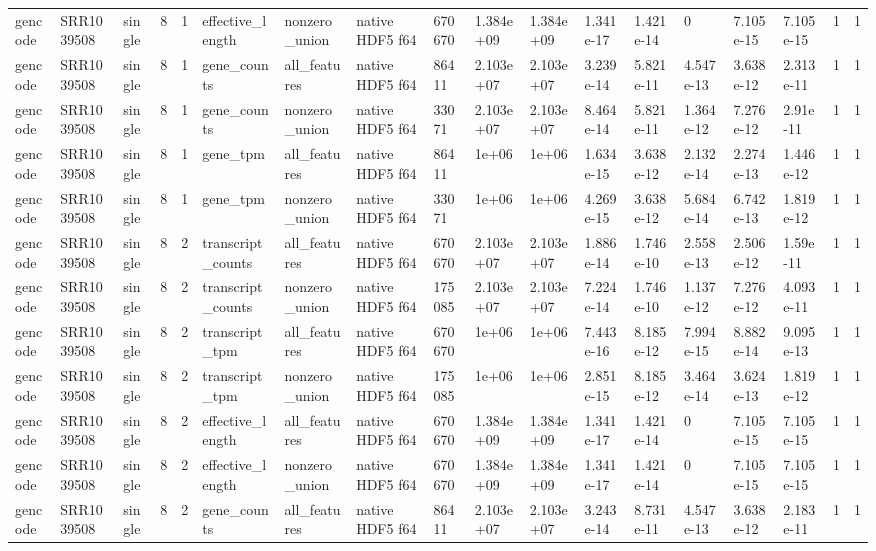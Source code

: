 \begin{tabular}{llllllllllllllllll}
gencode & SRR1039508 & single & 8 & 1 & effective\_length & nonzero\_union & native HDF5 f64 & 670670 & 1.384e+09 & 1.384e+09 & 1.341e-17 & 1.421e-14 & 0 & 7.105e-15 & 7.105e-15 & 1 & 1 \\
gencode & SRR1039508 & single & 8 & 1 & gene\_counts & all\_features & native HDF5 f64 & 86411 & 2.103e+07 & 2.103e+07 & 3.239e-14 & 5.821e-11 & 4.547e-13 & 3.638e-12 & 2.313e-11 & 1 & 1 \\
gencode & SRR1039508 & single & 8 & 1 & gene\_counts & nonzero\_union & native HDF5 f64 & 33071 & 2.103e+07 & 2.103e+07 & 8.464e-14 & 5.821e-11 & 1.364e-12 & 7.276e-12 & 2.91e-11 & 1 & 1 \\
gencode & SRR1039508 & single & 8 & 1 & gene\_tpm & all\_features & native HDF5 f64 & 86411 & 1e+06 & 1e+06 & 1.634e-15 & 3.638e-12 & 2.132e-14 & 2.274e-13 & 1.446e-12 & 1 & 1 \\
gencode & SRR1039508 & single & 8 & 1 & gene\_tpm & nonzero\_union & native HDF5 f64 & 33071 & 1e+06 & 1e+06 & 4.269e-15 & 3.638e-12 & 5.684e-14 & 6.742e-13 & 1.819e-12 & 1 & 1 \\
gencode & SRR1039508 & single & 8 & 2 & transcript\_counts & all\_features & native HDF5 f64 & 670670 & 2.103e+07 & 2.103e+07 & 1.886e-14 & 1.746e-10 & 2.558e-13 & 2.506e-12 & 1.59e-11 & 1 & 1 \\
gencode & SRR1039508 & single & 8 & 2 & transcript\_counts & nonzero\_union & native HDF5 f64 & 175085 & 2.103e+07 & 2.103e+07 & 7.224e-14 & 1.746e-10 & 1.137e-12 & 7.276e-12 & 4.093e-11 & 1 & 1 \\
gencode & SRR1039508 & single & 8 & 2 & transcript\_tpm & all\_features & native HDF5 f64 & 670670 & 1e+06 & 1e+06 & 7.443e-16 & 8.185e-12 & 7.994e-15 & 8.882e-14 & 9.095e-13 & 1 & 1 \\
gencode & SRR1039508 & single & 8 & 2 & transcript\_tpm & nonzero\_union & native HDF5 f64 & 175085 & 1e+06 & 1e+06 & 2.851e-15 & 8.185e-12 & 3.464e-14 & 3.624e-13 & 1.819e-12 & 1 & 1 \\
gencode & SRR1039508 & single & 8 & 2 & effective\_length & all\_features & native HDF5 f64 & 670670 & 1.384e+09 & 1.384e+09 & 1.341e-17 & 1.421e-14 & 0 & 7.105e-15 & 7.105e-15 & 1 & 1 \\
gencode & SRR1039508 & single & 8 & 2 & effective\_length & nonzero\_union & native HDF5 f64 & 670670 & 1.384e+09 & 1.384e+09 & 1.341e-17 & 1.421e-14 & 0 & 7.105e-15 & 7.105e-15 & 1 & 1 \\
gencode & SRR1039508 & single & 8 & 2 & gene\_counts & all\_features & native HDF5 f64 & 86411 & 2.103e+07 & 2.103e+07 & 3.243e-14 & 8.731e-11 & 4.547e-13 & 3.638e-12 & 2.183e-11 & 1 & 1 \\

\end{tabular}
